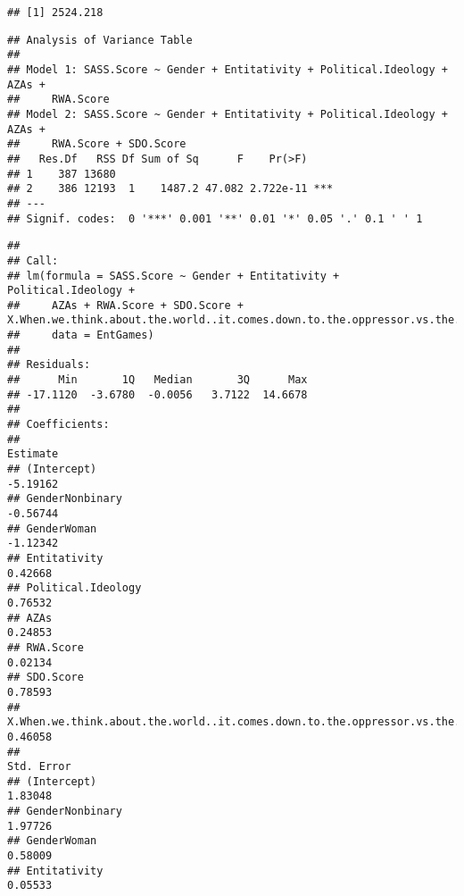 \documentclass[
  doc,draftall]{apa6}
\begin{document}
\begin{verbatim}
## [1] 2524.218
\end{verbatim}

\begin{verbatim}
## Analysis of Variance Table
## 
## Model 1: SASS.Score ~ Gender + Entitativity + Political.Ideology + AZAs + 
##     RWA.Score
## Model 2: SASS.Score ~ Gender + Entitativity + Political.Ideology + AZAs + 
##     RWA.Score + SDO.Score
##   Res.Df   RSS Df Sum of Sq      F    Pr(>F)    
## 1    387 13680                                  
## 2    386 12193  1    1487.2 47.082 2.722e-11 ***
## ---
## Signif. codes:  0 '***' 0.001 '**' 0.01 '*' 0.05 '.' 0.1 ' ' 1
\end{verbatim}

\begin{verbatim}
## 
## Call:
## lm(formula = SASS.Score ~ Gender + Entitativity + Political.Ideology + 
##     AZAs + RWA.Score + SDO.Score + X.When.we.think.about.the.world..it.comes.down.to.the.oppressor.vs.the.oppressed.., 
##     data = EntGames)
## 
## Residuals:
##      Min       1Q   Median       3Q      Max 
## -17.1120  -3.6780  -0.0056   3.7122  14.6678 
## 
## Coefficients:
##                                                                                    Estimate
## (Intercept)                                                                        -5.19162
## GenderNonbinary                                                                    -0.56744
## GenderWoman                                                                        -1.12342
## Entitativity                                                                        0.42668
## Political.Ideology                                                                  0.76532
## AZAs                                                                                0.24853
## RWA.Score                                                                           0.02134
## SDO.Score                                                                           0.78593
## X.When.we.think.about.the.world..it.comes.down.to.the.oppressor.vs.the.oppressed..  0.46058
##                                                                                    Std. Error
## (Intercept)                                                                           1.83048
## GenderNonbinary                                                                       1.97726
## GenderWoman                                                                           0.58009
## Entitativity                                                                          0.05533

\end{verbatim}
\end{document}
